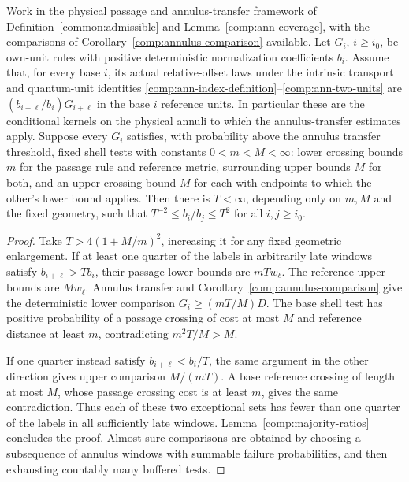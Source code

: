 \begin{proposition}
\label{comp:relative-units}
Work in the physical passage and annulus-transfer framework of
Definition~\ref{common:admissible} and Lemma~\ref{comp:ann-coverage}, with
the comparisons of Corollary~\ref{comp:annulus-comparison} available.
Let $G_i$, $i\ge i_0$, be own-unit rules with positive deterministic
normalization coefficients $b_i$. Assume that, for every base $i$, its
actual relative-offset laws under the intrinsic transport and quantum-unit
identities \eqref{comp:ann-index-definition}--\eqref{comp:ann-two-units}
are $(b_{i+\ell}/b_i)G_{i+\ell}$ in the base $i$ reference units.
In particular these are the conditional kernels on the physical annuli
to which the annulus-transfer estimates apply.
Suppose every $G_i$ satisfies, with
probability above the annulus transfer threshold, fixed shell tests
with constants $0<m<M<\infty$: lower crossing bounds $m$ for the
passage rule and reference metric, surrounding upper bounds $M$ for
both, and an upper crossing bound $M$ for each with endpoints to which
the other's lower bound applies. Then there is $T<\infty$, depending only on $m,M$
and the fixed geometry, such that
$T^{-2}\le b_i/b_j\le T^2$ for all $i,j\ge i_0$.
\end{proposition}

\begin{proof}
Take $T>4(1+M/m)^2$, increasing it for any fixed geometric enlargement.
If at least one quarter of the labels in arbitrarily late windows
satisfy $b_{i+\ell}>Tb_i$, their passage lower bounds are $mTw_\ell$.
The reference upper bounds are $Mw_\ell$.  Annulus transfer and
Corollary~\ref{comp:annulus-comparison} give the deterministic lower
comparison $G_i\ge(mT/M)D$.  The base shell test has positive probability
of a passage crossing of cost at most $M$ and reference distance at
least $m$, contradicting $m^2T/M>M$.

If one quarter instead satisfy $b_{i+\ell}<b_i/T$, the same argument
in the other direction gives upper comparison $M/(mT)$.  A base
reference crossing of length at most $M$, whose passage crossing cost
is at least $m$, gives the same contradiction.  Thus each of these two
exceptional sets has fewer than one quarter of the labels in all
sufficiently late windows.  Lemma~\ref{comp:majority-ratios} concludes
the proof.  Almost-sure comparisons are obtained by choosing a
subsequence of annulus windows with summable failure probabilities,
and then exhausting countably many buffered tests.
\end{proof}

